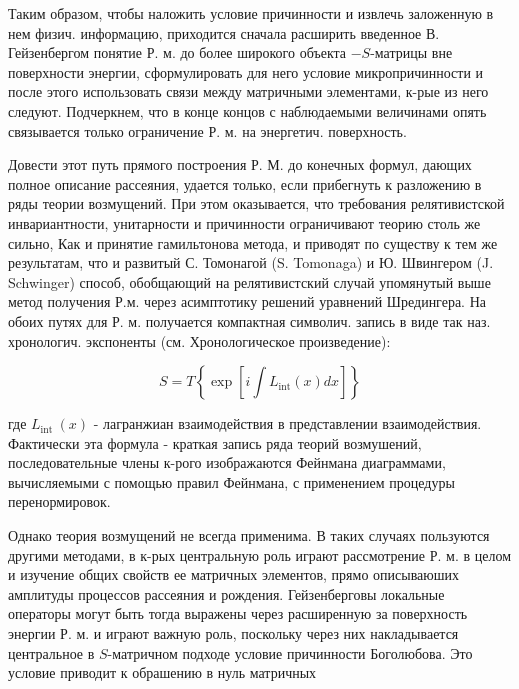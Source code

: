 \documentclass[10pt]{article}
\begin{document}
Таким образом, чтобы наложить условие причинности и извлечь заложенную в нем физич. информацию, приходится сначала расширить введенное В. Гейзенбергом понятие Р. м. до более широкого объекта $-S$-матрицы вне поверхности энергии, сформулировать для него условие микропричинности и после этого использовать связи между матричными элементами, к-рые из него следуют. Подчеркнем, что в конце концов с наблюдаемыми величинами опять связывается только ограничение Р. м. на энергетич. поверхность.



Довести этот путь прямого построения Р. М. до конечных формул, дающих полное описание рассеяния, удается только, если прибегнуть к разложению в ряды теории возмущений. При этом оказывается, что требования релятивистской инвариантности, унитарности и причинности ограничивают теорию столь же сильно, Как и принятие гамильтонова метода, и приводят по существу к тем же результатам, что и развитый С. Томонагой (S. Tomonaga) и Ю. Швингером (J. Schwinger) способ, обобщающий на релятивистский случай упомянутый выше метод получения Р.м. через асимптотику решений уравнений Шредингера. На обоих путях для Р. м. получается компактная символич. запись в виде так наз. хронологич. экспоненты (см. Хронологическое произведение):



\[

S=T\left\{\exp \left[i \int L_{\mathrm{int}}(x) d x\right]\right\}

\]



где $L_{\text {int }}(x)$ - лагранжиан взаимодействия в представлении взаимодействия. Фактически эта формула - краткая запись ряда теорий возмушений, последовательные члены к-рого изображаются Фейнмана диаграммами, вычисляемыми с помощью правил Фейнмана, с применением процедуры перенормировок.



Однако теория возмущений не всегда применима. В таких случаях пользуются другими методами, в к-рых центральную роль играют рассмотрение Р. м. в целом и изучение общих свойств ее матричных элементов, прямо описываюших амплитуды процессов рассеяния и рождения. Гейзенберговы локальные операторы могут быть тогда выражены через расширенную за поверхность энергии Р. м. и играют важную роль, поскольку через них накладывается центральное в $S$-матричном подходе условие причинности Боголюбова. Это условие приводит к обрашению в нуль матричных
\end{document}
